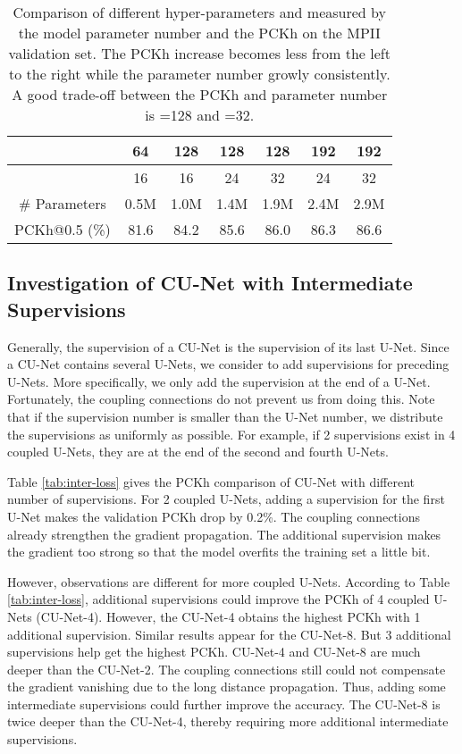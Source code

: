 \documentclass{bmvc2k}
\begin{document}
\begin{table}[t!]
\begin{center}
\caption{Comparison of different hyper-parameters  and  measured by the model parameter number and the PCKh on the MPII validation set. The PCKh increase becomes less from the left to the right while the parameter number growly consistently. A good trade-off between the PCKh and parameter number is =128 and =32.}\label{tb:mn-para}
\begin{tabular}{c|cccccc}
\toprule
 & 64 & 128 & 128 & 128 & 192 & 192\\
\hline
 & 16 & 16 & 24 & 32 & 24 & 32\\
\hline
\# Parameters & 0.5M & 1.0M & 1.4M & 1.9M & 2.4M  & 2.9M\\
\hline
PCKh@0.5 (\%) & 81.6 & 84.2 & 85.6 & 86.0 & 86.3 & 86.6\\
\bottomrule
\end{tabular}  
\end{center}
\end{table}

\subsection{Investigation of CU-Net with Intermediate Supervisions}
Generally, the supervision of a CU-Net is the supervision of its last U-Net. Since a CU-Net  contains several U-Nets, we consider to add supervisions for preceding U-Nets. More specifically, we only add the supervision at the end of a U-Net. Fortunately, the coupling connections do not prevent us from doing this. Note that if the supervision number is smaller than the U-Net number, we distribute the supervisions as uniformly as possible. For example, if 2 supervisions exist in 4 coupled U-Nets, they are at the end of the second and fourth U-Nets. 

Table \ref{tab:inter-loss} gives the PCKh comparison of CU-Net with different number of supervisions. For 2 coupled U-Nets, adding a supervision for the first U-Net makes the validation PCKh drop by 0.2\%. The coupling connections already strengthen the gradient propagation. The additional supervision makes the gradient too strong so that the model overfits the training set a little bit.

However, observations are different for more coupled U-Nets. According to Table \ref{tab:inter-loss}, additional supervisions could improve the PCKh of 4 coupled U-Nets (CU-Net-4). However, the CU-Net-4 obtains the highest PCKh with 1 additional supervision. Similar results appear for the CU-Net-8. But 3 additional supervisions help get the highest PCKh. CU-Net-4 and CU-Net-8 are much deeper than the CU-Net-2. The coupling connections still could not compensate the gradient vanishing due to the long distance propagation. Thus, adding some intermediate supervisions could further improve the accuracy. The CU-Net-8 is twice deeper than the CU-Net-4, thereby requiring more additional intermediate supervisions.
\end{document}
